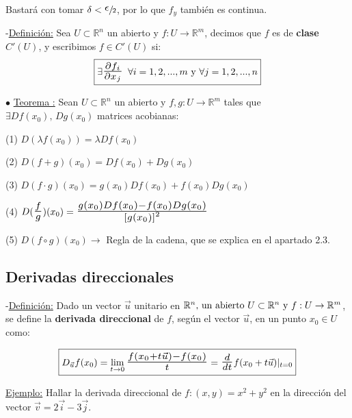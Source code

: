 \documentclass[10pt, titlepage]{article}
\newcommand{\R}{\mathbb{R}}
\newcommand{\bfrac}[2]{\scalebox{1.4}{$\frac{#1}{#2}$}}
\newcommand{\spac}{\, \, \,}
\newcommand{\definicion}{\noindent-\underline{Definición:} }
\newcommand{\teorema}[1][\!\!]{\noindent$\bullet$ \underline{Teorema #1:} }
\begin{document}
Bastará con tomar $\delta < \sfrac{\scalebox{1.5}{$\epsilon$}}{2}$, por lo que $f_y$ también es continua.
\vspace{7mm}

\definicion Sea $U \subset \R^n$ un abierto y $f : U \to \R^m$, decimos que $f$ es de \textbf{clase 
$C' (U)$}, y escribimos $f \in C' (U)$ si:
\[
\boxed{
\exists \bfrac{\partial f_i}{\partial x_j} \spac \forall i = 1, 2,..., m \text{ y } \forall j = 1, 2,..., n
}
\]
\vspace{3mm}


\teorema Sean $U \subset \R^n$ un abierto y $f, g : U \to \R^m$ tales que $\exists Df (x_0) \text{, } Dg 
(x_0)$ matrices acobianas:
\vspace{3mm}

(1) $D (\lambda f (x_0)) = \lambda Df (x_0)$
\vspace{3mm}

(2) $D (f + g) (x_0) = Df (x_0) + Dg (x_0)$
\vspace{3mm}

(3) $D(f \cdot g) (x_0) = g (x_0) Df (x_0) + f (x_0) Dg (x_0)$
\vspace{3mm}

(4) $D (\bfrac{f}{g}) (x_0) = \bfrac{g (x_0) Df (x_0) - f (x_0) Dg (x_0)}{{[g (x_0)]}^2}$
\vspace{3mm}

(5) $D (f \circ g) (x_0) \rightarrow$ Regla de la cadena, que se explica en el apartado 2.3.
\vspace{7mm}

\subsection{Derivadas direccionales}
\vspace{3mm}

\definicion Dado un vector $\vec{u}$ unitario en $\R^n \text{, un abierto } U \subset \R^n \text{ y } \\
f : U \to \R^m$, se define la \textbf{derivada direccional} de $f$, según el vector $\vec{u}$, en un punto 
$x_0 \in U$ como:
\vspace{3mm}

\[
\boxed{
D_{\vec{u}} f (x_0) = \displaystyle \lim_{t \to 0} \bfrac{f (x_0 + t \vec{u}) - f (x_0)}{t} = \bfrac{d}{dt} 
f (x_0 + t \vec{u}) |_{t = 0}
}
\]
\vspace{5mm}

\underline{Ejemplo:}  Hallar la derivada direccional de $f : (x, y) = x^2 + y^2$ en la dirección del vector 
$\vec{v} = 2 \vec{i} - 3 \vec{j}$.
\vspace{3mm}
\end{document}
